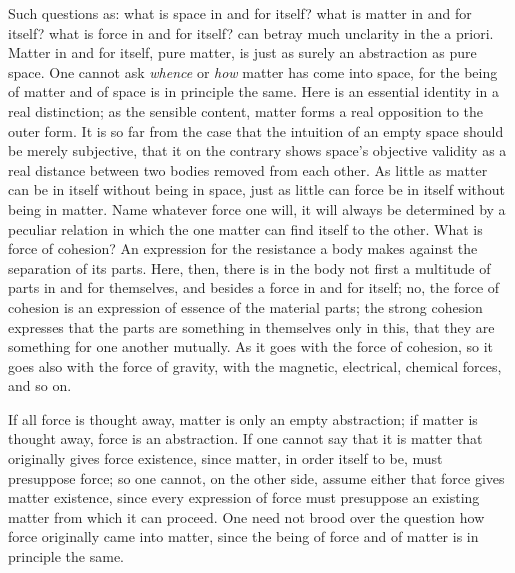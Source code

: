 \documentclass[12pt]{book}
\begin{document}
Such questions as: what is space in and for itself? what is matter in and for
itself? what is force in and for itself? can betray much unclarity in the a priori.
Matter in and for itself, pure matter, is just as surely an abstraction as pure
space. One cannot ask \emph{whence} or \emph{how} matter has come into space, for
the being of matter and of space is in principle the same. Here is an essential
identity in a real distinction; as the sensible content, matter forms a real
opposition to the outer form. It is so far from the case that the intuition of an
empty space should be merely subjective, that it on the contrary shows space's
objective validity as a real distance between two bodies removed from each other.
As little as matter can be in itself without being in space, just as little can
force be in itself without being in matter. Name whatever force one will, it will
always be determined by a peculiar relation in which the one matter can find itself
to the other. What is force of cohesion? An expression for the resistance a body
makes against the separation of its parts. Here, then, there is in the body not
first a multitude of parts in and for themselves, and besides a force in and for
itself; no, the force of cohesion is an expression of essence of the material
parts; the strong cohesion expresses that the parts are something in themselves
only in this, that they are something for one another mutually. As it goes with the
force of cohesion, so it goes also with the force of gravity, with the magnetic,
electrical, chemical forces, and so on.

If all force is thought away, matter is only an empty abstraction; if matter is
thought away, force is an abstraction. If one cannot say that it is matter that
originally gives force existence, since matter, in order itself to be, must
presuppose force; so one cannot, on the other side, assume either that force gives
matter existence, since every expression of force must presuppose an existing
matter from which it can proceed. One need not brood over the question how force
originally came into matter, since the being of force and of matter is in principle
the same.
\end{document}
